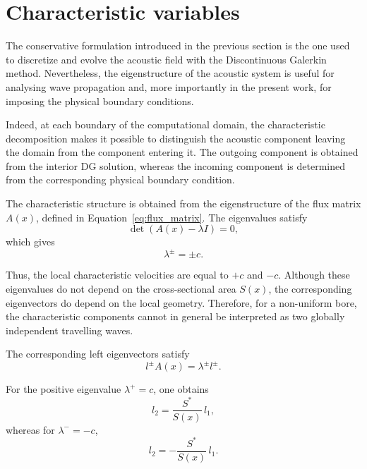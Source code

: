 \documentclass[11pt,a4paper]{report}
\theoremstyle{plain}
\theoremstyle{definition}
\begin{document}

\section{Characteristic variables}
\label{sec:characteristic_variables}

The conservative formulation introduced in the previous section is the one
used to discretize and evolve the acoustic field with the Discontinuous
Galerkin method. Nevertheless, the eigenstructure of the acoustic system is
useful for analysing wave propagation and, more importantly in the present
work, for imposing the physical boundary conditions.

Indeed, at each boundary of the computational domain, the characteristic
decomposition makes it possible to distinguish the acoustic component leaving
the domain from the component entering it. The outgoing component is obtained
from the interior DG solution, whereas the incoming component is determined
from the corresponding physical boundary condition.

The characteristic structure is obtained from the eigenstructure of the flux
matrix \(A(x)\), defined in Equation~\eqref{eq:flux_matrix}. The eigenvalues
satisfy
\begin{equation}
\det\left(A(x)-\lambda I\right)=0,
\end{equation}
which gives
\begin{equation}
\boxed{
\lambda^\pm=\pm c.
}
\label{eq:characteristic_eigenvalues}
\end{equation}

Thus, the local characteristic velocities are equal to \(+c\) and \(-c\).
Although these eigenvalues do not depend on the cross-sectional area \(S(x)\),
the corresponding eigenvectors do depend on the local geometry. Therefore,
for a non-uniform bore, the characteristic components cannot in general be
interpreted as two globally independent travelling waves.

The corresponding left eigenvectors satisfy
\begin{equation}
l^\pm A(x)
=
\lambda^\pm l^\pm.
\end{equation}

For the positive eigenvalue \(\lambda^+=c\), one obtains
\begin{equation}
l_2
=
\frac{S^\ast}{S(x)}\,l_1,
\end{equation}
whereas for \(\lambda^-=-c\),
\begin{equation}
l_2
=
-
\frac{S^\ast}{S(x)}\,l_1.
\end{equation}
\end{document}

